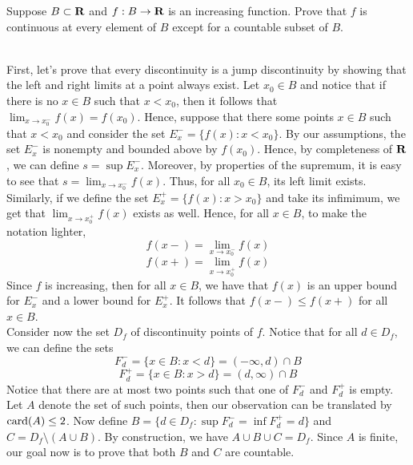 \begin{exercise}
    Suppose $B \subset \mathbf{R}$ and $f : B \to \mathbf{R}$ is an increasing function. Prove that $f$ is continuous at every element of $B$ except for a countable subset of $B$. \\
\end{exercise}

\begin{solution}
    \\ First, let's prove that every discontinuity is a jump discontinuity by showing that the left and right limits at a point always exist. Let $x_0 \in B$ and notice that if there is no $x \in B$ such that $x < x_0$, then it follows that $\lim_{x \rightarrow x_0^-}f(x) = f(x_0)$. Hence, suppose that there some points $x \in B$ such that $x < x_0$ and consider the set $E_x^- = \{f(x) : x < x_0\}$. By our assumptions, the set $E_x^-$ is nonempty and bounded above by $f(x_0)$. Hence, by completeness of $\mathbf{R}$, we can define $s = \sup E_x^-$. Moreover, by properties of the supremum, it is easy to see that 
    $s = \lim_{x \rightarrow x_0^-}f(x)$. Thus, for all $x_0 \in B$, its left limit exists. Similarly, if we define the set $E_x^+ = \{f(x) : x > x_0\}$ and take its infimimum, we get that $ \lim_{x \rightarrow x_0^+}f(x)$ exists as well. Hence, for all $x \in B$, to make the notation lighter, 
    $$f(x-) = \lim_{x \rightarrow x_0^-}f(x)$$
    $$f(x+) = \lim_{x \rightarrow x_0^+}f(x)$$
    Since $f$ is increasing, then for all $x \in B$, we have that $f(x)$ is an upper bound for $E_x^-$ and a lower bound for $E_x^+$. It follows that $f(x-) \leq f(x+)$ for all $x \in B$.
    \\ Consider now the set $D_f$ of discontinuity points of $f$. Notice that for all $d \in D_f$, we can define the sets 
    $$F_d^- = \{x \in B : x < d\} = (- \infty, d) \cap B$$
    $$F_d^+ = \{x \in B : x > d\} = (d,\infty) \cap B$$
    Notice that there are at most two points such that one of $F_d^-$ and $F_d^+$ is empty. Let $A$ denote the set of such points, then our observation can be translated by $\text{card}(A) \leq 2$. Now define $B = \{d \in D_f : \sup F_d^- = \inf F_d^+ = d\}$ and $C = D_f \setminus (A \cup B)$. By construction, we have $A \cup B \cup C = D_f$. Since $A$ is finite, our goal now is to prove that both $B$ and $C$ are countable.\\


\end{solution}
